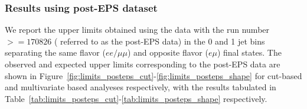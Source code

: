 

\subsubsection{Results using post-EPS dataset}

We report the upper limits obtained using the data with the run number $>=170826$ ( referred to 
as the post-EPS data) in the 0 and 1 jet bins separating the 
same flavor ($ee/\mu\mu$) and opposite flavor ($e\mu$) final states.
The observed and expected upper limits corresponding to the post-EPS data are shown in 
Figure~\ref{fig:limits_posteps_cut}-\ref{fig:limits_posteps_shape} for cut-based and multivariate 
based analyeses respectively, with the results tabulated in 
Table~\ref{tab:limits_posteps_cut}-\ref{tab:limits_posteps_shape} respectively.


